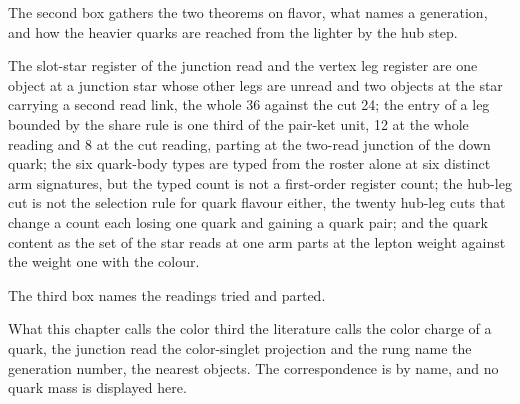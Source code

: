 The second box gathers the two theorems on flavor, what names a generation, and how the heavier quarks are reached from the lighter by the hub step.
\begin{chwall}\label{box:VII-7-quark-content-and-flavour:3}
The slot-star register of the junction read and the vertex leg register are one object at a junction star whose other legs are unread and two objects at the star carrying a second read link, the whole 36 against the cut 24; the entry of a leg bounded by the share rule is one third of the pair-ket unit, 12 at the whole reading and 8 at the cut reading, parting at the two-read junction of the down quark; the six quark-body types are typed from the roster alone at six distinct arm signatures, but the typed count is not a first-order register count; the hub-leg cut is not the selection rule for quark flavour either, the twenty hub-leg cuts that change a count each losing one quark and gaining a quark pair; and the quark content as the set of the star reads at one arm parts at the lepton weight against the weight one with the colour.
\end{chwall}
The third box names the readings tried and parted.
\begin{chbridge}
What this chapter calls the color third the literature calls the color charge of a quark, the junction read the color-singlet projection and the rung name the generation number, the nearest objects. The correspondence is by name, and no quark mass is displayed here.
\end{chbridge}
